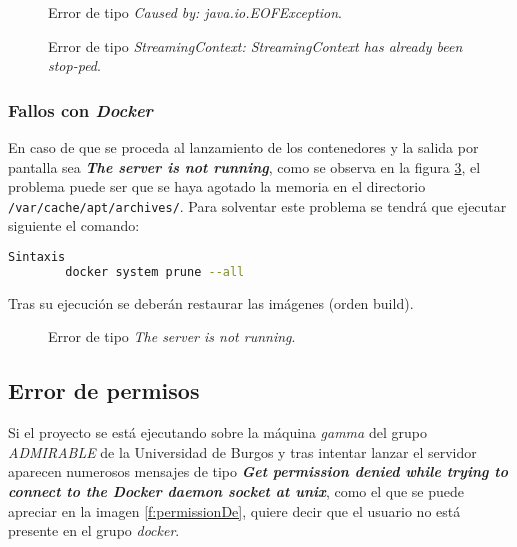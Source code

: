 \begin{figure}[H]
 \centering
{}
 \caption{Error de tipo \textit{Caused by: java.io.EOFException}.}
 \label{f:EOFException}
\end{figure}

\begin{figure}[H]
 \centering
{}
 \caption{Error de tipo \textit{StreamingContext: StreamingContext has already been stop-ped}.}
 \label{f:StreamingContext}
\end{figure}


\subsubsection{Fallos con \textit{Docker}}

En caso de que se proceda al lanzamiento de los contenedores y la salida por pantalla sea \textit{\textbf{The server is not running}}, como se observa en la figura \ref{f:servernotrunning}, el problema puede ser que se haya agotado la memoria en el directorio \texttt{/var/cache/apt/archives/}. Para solventar este problema se tendrá que ejecutar siguiente el comando:
\begin{lstlisting}[language=Bash]
 Sintaxis
	    docker system prune --all
\end{lstlisting}

Tras su ejecución se deberán restaurar las imágenes (orden build).

\begin{figure}[H]
 \centering
{}
 \caption{Error de tipo \textit{The server is not running}.}
 \label{f:servernotrunning}
\end{figure}

\subsection{Error de permisos}
Si el proyecto se está ejecutando sobre la máquina \textit{gamma} del grupo \textit{ADMIRABLE} de la Universidad de Burgos y tras intentar lanzar el servidor aparecen numerosos mensajes de tipo \textit{\textbf{Get permission denied while trying to connect to the Docker daemon socket at unix}}, como el que se puede apreciar en la imagen \ref{f:permissionDe}, quiere decir que el usuario no está presente en el grupo \textit{docker}.

